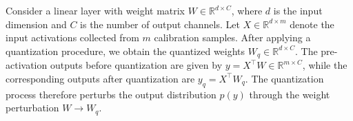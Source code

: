 \documentclass[table, 11pt]{article}
\begin{document}




Consider a linear layer with weight matrix $W \in \mathbb{R}^{d \times C}$, where $d$ is the input dimension and $C$ is the number of output channels. Let $X \in \mathbb{R}^{d \times m}$ denote the input activations collected from $m$ calibration samples. After applying a quantization procedure, we obtain the quantized weights $W_q \in \mathbb{R}^{d \times C}$. The pre-activation outputs before quantization are given by $y = X^{\top} W \in \mathbb{R}^{m \times C}$, while the corresponding outputs after quantization are $y_q = X^{\top} W_q$. The quantization process therefore perturbs the output distribution $p(y)$ through the weight perturbation $W \rightarrow W_q$.
\end{document}
